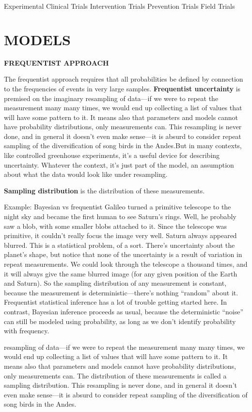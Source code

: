 \documentclass[
]{article}
\begin{document}
Experimental Clinical Trials Intervention Trials Prevention Trials Field
Trials

\hypertarget{models}{%
\section{\texorpdfstring{\textbf{MODELS}}{MODELS}}\label{models}}

\textbf{FREQUENTIST APPROACH}

The frequentist approach requires that all probabilities be defined by
connection to the frequencies of events in very large samples.
\textbf{Frequentist uncertainty} is premised on the imaginary resampling
of data---if we were to repeat the measurement many many times, we would
end up collecting a list of values that will have some pattern to it. It
means also that parameters and models cannot have probability
distributions, only measurements can. This resampling is never done, and
in general it doesn't even make sense---it is absurd to consider repeat
sampling of the diversification of song birds in the Andes.But in many
contexts, like controlled greenhouse experiments, it's a useful device
for describing uncertainty. Whatever the context, it's just part of the
model, an assumption about what the data would look like under
resampling.

\textbf{Sampling distribution} is the distribution of these
measurements.

Example: Bayesian vs frequentist Galileo turned a primitive telescope to
the night sky and became the first human to see Saturn's rings. Well, he
probably saw a blob, with some smaller blobs attached to it. Since the
telescope was primitive, it couldn't really focus the image very well.
Saturn always appeared blurred. This is a statistical problem, of a
sort. There's uncertainty about the planet's shape, but notice that none
of the uncertainty is a result of variation in repeat measurements. We
could look through the telescope a thousand times, and it will always
give the same blurred image (for any given position of the Earth and
Saturn). So the sampling distribution of any measurement is constant,
because the measurement is deterministic---there's nothing ``random''
about it. Frequentist statistical inference has a lot of trouble getting
started here. In contrast, Bayesian inference proceeds as usual, because
the deterministic ``noise'' can still be modeled using probability, as
long as we don't identify probability with frequency.

resampling of data---if we were to repeat the measurement many many
times, we would end up collecting a list of values that will have some
pattern to it. It means also that parameters and models cannot have
probability distributions, only measurements can. The distribution of
these measurements is called a sampling distribution. This resampling is
never done, and in general it doesn't even make sense---it is absurd to
consider repeat sampling of the diversification of song birds in the
Andes.
\end{document}
